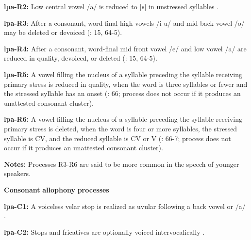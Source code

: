 \documentclass[output=paper]{langsci/langscibook}
\begin{document}
\begin{styleBody}
\textbf{lpa-R2:} Low central vowel /a/ is reduced to [ɐ] in unstressed syllables \citep[34-5]{Lacrampe2014}.
\end{styleBody}

\begin{styleBody}
\textbf{lpa-R3}: After a consonant, word-final high vowels /i u/ and mid back vowel /o/ may be deleted or devoiced (\citealt{Lacrampe2014}: 15, 64-5).
\end{styleBody}

\begin{styleBody}
\textbf{lpa-R4:} After a consonant, word-final mid front vowel /e/ and low vowel /a/ are reduced in quality, devoiced, or deleted (\citealt{Lacrampe2014}: 15, 64-5).
\end{styleBody}

\begin{styleBody}
\textbf{lpa-R5:} A vowel filling the nucleus of a syllable preceding the syllable receiving primary stress is reduced in quality, when the word is three syllables or fewer and the stressed syllable has an onset (\citealt{Lacrampe2014}: 66; process does not occur if it produces an unattested consonant cluster).
\end{styleBody}

\begin{styleBody}
\textbf{lpa-R6:} A vowel filling the nucleus of a syllable preceding the syllable receiving primary stress is deleted, when the word is four or more syllables, the stressed syllable is CV, and the reduced syllable is CV or V (\citealt{Lacrampe2014}: 66-7; process does not occur if it produces an unattested consonant cluster).
\end{styleBody}

\begin{styleBody}
\textbf{Notes:} Processes R3-R6 are said to be more common in the speech of younger speakers.
\end{styleBody}

\begin{styleBody}
\textbf{Consonant} \textbf{allophony} \textbf{processes}
\end{styleBody}

\begin{styleBody}
\textbf{lpa-C1:} A voiceless velar stop is realized as uvular following a back vowel or /a/ \citep[19]{Lacrampe2014}.
\end{styleBody}

\begin{styleBody}
\textbf{lpa-C2:} Stops and fricatives are optionally voiced intervocalically \citep[17]{Lacrampe2014}.
\end{styleBody}
\end{document}

